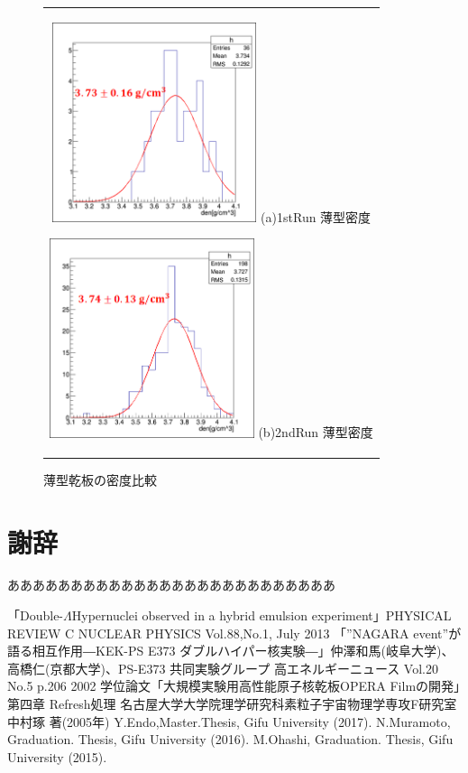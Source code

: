 \documentclass[12pt,a4paper]{jarticle}
\begin{document}
\begin{figure}[htbp]
  \centering
      \begin{tabular}{c}
        \begin{minipage}{0.5\hsize}
          \centering
            \includegraphics[clip, width=60mm]{1stRun_thin_den.png}
            \hspace{1.6cm} (a)1stRun 薄型密度
        \end{minipage}
        
        \begin{minipage}{0.5\hsize}
          \centering
            \includegraphics[clip, width=60mm]{2ndRun_thin_den.png}
            \hspace{1.6cm} (b)2ndRun 薄型密度
        \end{minipage}
    
      \end{tabular}
      \caption{薄型乾板の密度比較\label{fig:compare_thin_den}}
\end{figure}
\newpage
\section*{謝辞}
ああああああああああああああああああああああああああ
\begin{thebibliography}{99}
 「Double-$\Lambda$Hypernuclei observed in a hybrid emulsion experiment」PHYSICAL REVIEW C NUCLEAR PHYSICS Vol.88,No.1, July 2013
 「”NAGARA event”が語る相互作用―KEK-PS E373 ダブルハイパー核実験―」仲澤和馬(岐阜大学)、高橋仁(京都大学)、PS-E373 共同実験グループ 高エネルギーニュース Vol.20 No.5 p.206 2002
 学位論文「大規模実験用高性能原子核乾板OPERA Filmの開発」第四章 Refresh処理 名古屋大学大学院理学研究科素粒子宇宙物理学専攻F研究室 中村琢 著(2005年)
 Y.Endo,Master.Thesis, Gifu University (2017).
 N.Muramoto, Graduation. Thesis, Gifu University (2016).
 M.Ohashi, Graduation. Thesis, Gifu University (2015).
\end{thebibliography}
\end{document}
